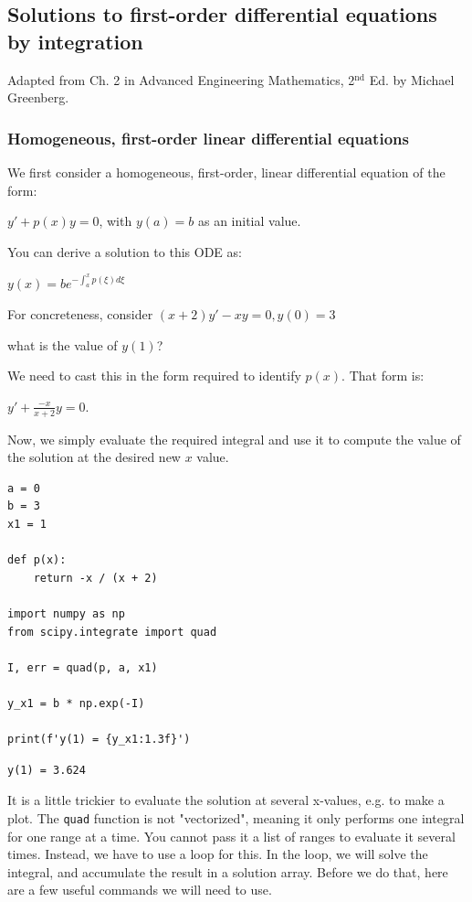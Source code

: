 \documentclass[11pt]{article}
\begin{document}
\subsection{Solutions to first-order differential equations by integration}
\label{sec:orgb01ec23}

Adapted from Ch. 2 in Advanced Engineering Mathematics, 2\(^{\text{nd}}\) Ed. by Michael Greenberg.

\subsubsection{Homogeneous, first-order linear differential equations}
\label{sec:orgfe3b55c}

We first consider a homogeneous, first-order, linear differential equation of the form:

\(y' + p(x) y = 0\), with \(y(a) = b\) as an initial value.

You can derive a solution to this ODE as:

\(y(x) = b e^{-\int_a^x p(\xi) d\xi}\)

For concreteness, consider \((x+2) y' - xy = 0, y(0) = 3\)

what is the value of \(y(1)\)?

We need to cast this in the form required to identify \(p(x)\). That form is:

\(y' + \frac{-x}{x+2}y = 0\).

Now, we simply evaluate the required integral and use it to compute the value of the solution at the desired new \(x\) value.

\begin{verbatim}
a = 0
b = 3
x1 = 1

def p(x):
    return -x / (x + 2)

import numpy as np
from scipy.integrate import quad

I, err = quad(p, a, x1)

y_x1 = b * np.exp(-I)

print(f'y(1) = {y_x1:1.3f}')
\end{verbatim}

\begin{verbatim}
y(1) = 3.624

\end{verbatim}

It is a little trickier to evaluate the solution at several x-values, e.g. to make a plot. The \texttt{quad} function is not "vectorized", meaning it only performs one integral for one range at a time. You cannot pass it a list of ranges to evaluate it several times. Instead, we have to use a loop for this. In the loop, we will solve the integral, and accumulate the result in a solution array. Before we do that, here are a few useful commands we will need to use.
\end{document}
